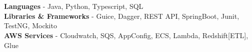 \newcommand{\skillItem}[2]{
    \textbf{#1} - #2 \\
}

\section{}

\skillItem{Languages}{Java, Python, Typescript, SQL}
\skillItem{Libraries \& Frameworks}{Guice, Dagger, REST API, SpringBoot, Junit, TestNG, Mockito}
\skillItem{AWS Services}{Cloudwatch, SQS, AppConfig, ECS, Lambda, Redshift[ETL], Glue}
